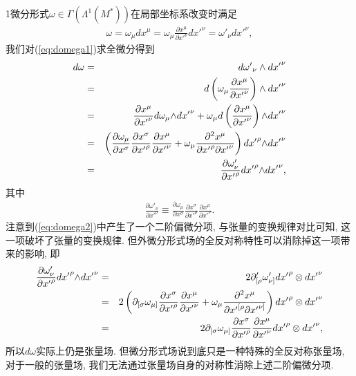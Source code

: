 \begin{remark}
  1微分形式$\omega\in \varGamma(\Lambda^{1}(M^{*}))$在局部坐标系改变时满足
  \begin{eqnarray}\label{eq:domega1}
    \omega=\omega_\mu dx^\mu=\omega_\mu\frac{\partial{x}^\mu}{\partial {x'}^\nu}d{x'}^\nu=\omega'_\nu d{x'}^\nu,
  \end{eqnarray}
  我们对(\ref{eq:domega1})求全微分得到
  \begin{eqnarray}\label{eq:domega2}
    d\omega
    &=& d{\omega'}_{\nu} \wedge d{x'}^\nu\notag\\
    &=& d\left(\omega_\mu\frac{\partial{x}^\mu}{{\partial}{x'}^\nu}\right)\wedge d{x'}^\nu\notag\\
    &=& \frac{\partial{x}^\mu}{{\partial}{x'}^\nu}d\omega_\mu{\wedge}d{x'}^\nu+\omega_{\mu}d\left(\frac{\partial{x}^\mu}{\partial {x'}^\nu}\right){\wedge}d{x'}^\nu\notag\\
    &=& \left(\frac{\partial{\omega}_\mu}{{\partial}{x}^\sigma}\frac{\partial{x}^\sigma}{\partial {x'}^\rho}\frac{\partial{x}^\mu}{{\partial}{x'}^\nu} + {\omega}_\mu\frac{\partial^2{x}^\mu}{\partial {x'}^\rho{\partial}{x'}^\nu}\right)d{x'}^\rho{\wedge}d{x'}^\nu\\
    &=& \frac{\partial\omega'_\nu}{{\partial}{x'}^\rho}d{x'}^\rho{\wedge}d{x'}^\nu\notag,
  \end{eqnarray}
  其中
  \begin{eqnarray*}
    \frac{\partial\omega'_\nu}{{\partial}{x'}^\rho} \equiv \frac{\partial{\omega}_\mu}{{\partial}{x}^\sigma}\frac{\partial{x}^\sigma}{\partial {x'}^\rho}\frac{\partial{x}^\mu}{{\partial}{x'}^\nu}.
  \end{eqnarray*}
  注意到(\ref{eq:domega2})中产生了一个二阶偏微分项, 与张量的变换规律对比可知, 这一项破坏了张量的变换规律. 但外微分形式场的全反对称特性可以消除掉这一项带来的影响, 即
  \begin{eqnarray}
    \frac{\partial\omega'_\nu}{{\partial}{x'}^\rho}d{x'}^\rho{\wedge}d{x'}^\nu&=&2\partial'_{[\rho}\omega'_{\nu]}{dx'}^{\rho}\otimes{dx'}^\nu\notag\\
    &=&2\left(\partial_{[\sigma}\omega_{\mu]}\frac{\partial{x}^\sigma}{\partial {x'}^\rho}\frac{\partial{x}^\mu}{{\partial}{x'}^\nu}+{\omega}_\mu\frac{\partial^2{x}^\mu}{\partial {x'}^{[\rho}{\partial}{x'}^{\nu]}}\right){dx'}^{\rho}\otimes{dx'}^\nu\notag\\
    &=&2\partial_{[\sigma}\omega_{\mu]}\frac{\partial{x}^\sigma}{\partial {x'}^\rho}\frac{\partial{x}^\mu}{{\partial}{x'}^\nu}{dx'}^{\rho}\otimes{dx'}^\nu,
  \end{eqnarray}
  所以$d\omega$实际上仍是张量场. 但微分形式场说到底只是一种特殊的全反对称张量场, 对于一般的张量场, 我们无法通过张量场自身的对称性消除上述二阶偏微分项.
\end{remark}

